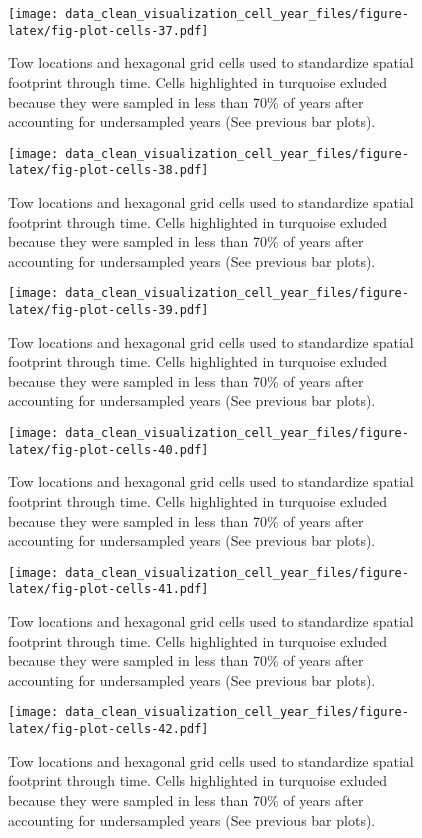 \documentclass[
]{article}
\begin{document}
\begin{figure}
\centering
\texttt{[image: data\_clean\_visualization\_cell\_year\_files/figure-latex/fig-plot-cells-37.pdf]}
\caption{\label{fig:fig-plot-cells-37}Tow locations and hexagonal grid cells used to standardize spatial footprint through time. Cells highlighted in turquoise exluded because they were sampled in less than 70\% of years after accounting for undersampled years (See previous bar plots).}
\end{figure}

\begin{figure}
\centering
\texttt{[image: data\_clean\_visualization\_cell\_year\_files/figure-latex/fig-plot-cells-38.pdf]}
\caption{\label{fig:fig-plot-cells-38}Tow locations and hexagonal grid cells used to standardize spatial footprint through time. Cells highlighted in turquoise exluded because they were sampled in less than 70\% of years after accounting for undersampled years (See previous bar plots).}
\end{figure}

\begin{figure}
\centering
\texttt{[image: data\_clean\_visualization\_cell\_year\_files/figure-latex/fig-plot-cells-39.pdf]}
\caption{\label{fig:fig-plot-cells-39}Tow locations and hexagonal grid cells used to standardize spatial footprint through time. Cells highlighted in turquoise exluded because they were sampled in less than 70\% of years after accounting for undersampled years (See previous bar plots).}
\end{figure}

\begin{figure}
\centering
\texttt{[image: data\_clean\_visualization\_cell\_year\_files/figure-latex/fig-plot-cells-40.pdf]}
\caption{\label{fig:fig-plot-cells-40}Tow locations and hexagonal grid cells used to standardize spatial footprint through time. Cells highlighted in turquoise exluded because they were sampled in less than 70\% of years after accounting for undersampled years (See previous bar plots).}
\end{figure}

\begin{figure}
\centering
\texttt{[image: data\_clean\_visualization\_cell\_year\_files/figure-latex/fig-plot-cells-41.pdf]}
\caption{\label{fig:fig-plot-cells-41}Tow locations and hexagonal grid cells used to standardize spatial footprint through time. Cells highlighted in turquoise exluded because they were sampled in less than 70\% of years after accounting for undersampled years (See previous bar plots).}
\end{figure}

\begin{figure}
\centering
\texttt{[image: data\_clean\_visualization\_cell\_year\_files/figure-latex/fig-plot-cells-42.pdf]}
\caption{\label{fig:fig-plot-cells-42}Tow locations and hexagonal grid cells used to standardize spatial footprint through time. Cells highlighted in turquoise exluded because they were sampled in less than 70\% of years after accounting for undersampled years (See previous bar plots).}
\end{figure}
\end{document}
